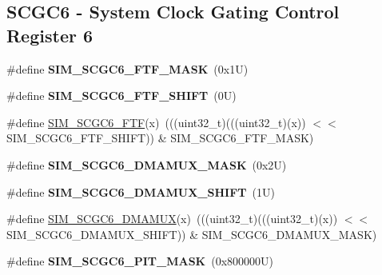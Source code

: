 \subsection*{S\+C\+G\+C6 -\/ System Clock Gating Control Register 6}
\begin{DoxyCompactItemize}
\item 
\mbox{\label{group___s_i_m___register___masks_ga949452096cb8609fdb3503dda3f9f729}} 
\#define {\bfseries S\+I\+M\+\_\+\+S\+C\+G\+C6\+\_\+\+F\+T\+F\+\_\+\+M\+A\+SK}~(0x1\+U)
\item 
\mbox{\label{group___s_i_m___register___masks_gaf767cc087ed5983b84e79996586efb12}} 
\#define {\bfseries S\+I\+M\+\_\+\+S\+C\+G\+C6\+\_\+\+F\+T\+F\+\_\+\+S\+H\+I\+FT}~(0\+U)
\item 
\#define \mbox{\hyperlink{group___s_i_m___register___masks_ga2c761f5f9e8cfb50bd7cb870945f4fd3}{S\+I\+M\+\_\+\+S\+C\+G\+C6\+\_\+\+F\+TF}}(x)~(((uint32\+\_\+t)(((uint32\+\_\+t)(x)) $<$$<$ S\+I\+M\+\_\+\+S\+C\+G\+C6\+\_\+\+F\+T\+F\+\_\+\+S\+H\+I\+FT)) \& S\+I\+M\+\_\+\+S\+C\+G\+C6\+\_\+\+F\+T\+F\+\_\+\+M\+A\+SK)
\item 
\mbox{\label{group___s_i_m___register___masks_ga10469a89e2c48cd79e29fb73b0d06395}} 
\#define {\bfseries S\+I\+M\+\_\+\+S\+C\+G\+C6\+\_\+\+D\+M\+A\+M\+U\+X\+\_\+\+M\+A\+SK}~(0x2\+U)
\item 
\mbox{\label{group___s_i_m___register___masks_gaa69ac431213fb94ecd1d9ed2fa966e50}} 
\#define {\bfseries S\+I\+M\+\_\+\+S\+C\+G\+C6\+\_\+\+D\+M\+A\+M\+U\+X\+\_\+\+S\+H\+I\+FT}~(1\+U)
\item 
\#define \mbox{\hyperlink{group___s_i_m___register___masks_ga9c9ba170477dab6105665d342c48de2f}{S\+I\+M\+\_\+\+S\+C\+G\+C6\+\_\+\+D\+M\+A\+M\+UX}}(x)~(((uint32\+\_\+t)(((uint32\+\_\+t)(x)) $<$$<$ S\+I\+M\+\_\+\+S\+C\+G\+C6\+\_\+\+D\+M\+A\+M\+U\+X\+\_\+\+S\+H\+I\+FT)) \& S\+I\+M\+\_\+\+S\+C\+G\+C6\+\_\+\+D\+M\+A\+M\+U\+X\+\_\+\+M\+A\+SK)
\item 
\mbox{\label{group___s_i_m___register___masks_gaf5baabd241aba695593ce6369aa56ee2}} 
\#define {\bfseries S\+I\+M\+\_\+\+S\+C\+G\+C6\+\_\+\+P\+I\+T\+\_\+\+M\+A\+SK}~(0x800000\+U)
\item 

\end{DoxyCompactItemize}
